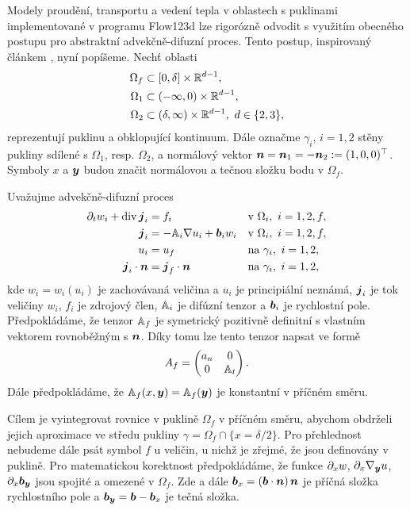 


Modely proudění, transportu a vedení tepla v oblastech s puklinami implementované v programu Flow123d lze rigorózně odvodit s využitím obecného postupu pro abstraktní advekčně-difuzní proces.
Tento postup, inspirovaný článkem \cite{martin_modeling_2005}, nyní popíšeme.
Nechť oblasti
\begin{align*}
 \Omega_f &\subset [0,\delta] \times \mathbb R^{d-1},\\
 \Omega_1 &\subset (-\infty,0)\times \mathbb R^{d-1},\\
 \Omega_2 &\subset (\delta,\infty)\times \mathbb R^{d-1},~d\in\{2,3\},
\end{align*}
reprezentují puklinu a obklopující kontinuum.
Dále označme $\gamma_i$, $i=1,2$ stěny pukliny sdílené s $\Omega_1$, resp. $\Omega_2$,
a normálový vektor $\mathbf{\boldsymbol{n}}=\mathbf{\boldsymbol{n}}_1=-\mathbf{\boldsymbol{n}}_2:=(1,0,0)^\top$.
Symboly $x$ a $\mathbf{\boldsymbol{y}}$ budou značit normálovou a tečnou složku bodu v $\Omega_f$. 

Uvažujme advekčně-difuzní proces
\begin{align}
  \label{eq:fr:continuity}
  \prtl_t w_i + \div \vc j_i &= f_i&&  \text{v } \Omega_i,\ i=1,2,f,\\
  \label{eq:fr:flux}
  \vc j_i &= - \tn A_i\grad u_i + \vc b_i w_i&& \text{v } \Omega_i,\ i=1,2,f,\\
  \label{eq:fr:Dirichlet}
  u_i &= u_f&& \text{na } \gamma_i,\ i=1,2,\\
  \label{eq:fr:Neumann}
  \vc j_i \cdot \vc n &= \vc j_f \cdot \vc n&& \text{na } \gamma_i,\ i=1,2,
\end{align}
kde $w_i=w_i(u_i)$ je zachovávaná veličina a $u_i$ je principiální neznámá, $\mathbf{\boldsymbol{j}}_i$ je tok veličiny $w_i$, $f_i$ je zdrojový člen,
${\mathbb{A}}_i$ je difúzní tenzor a $\mathbf{\boldsymbol{b}}_i$ je rychlostní pole.
Předpokládáme, že tenzor ${\mathbb{A}}_f$ je symetrický pozitivně definitní 
s vlastním vektorem rovnoběžným s $\mathbf{\boldsymbol{n}}$.
Díky tomu lze tento tenzor napsat ve formě
\[
 A_f = \begin{pmatrix} 
            a_n & 0  \\
            0 & {\mathbb{A}}_t
       \end{pmatrix}.
\]
Dále předpokládáme, že ${\mathbb{A}}_f(x, \mathbf{\boldsymbol{y}})={\mathbb{A}}_f(\mathbf{\boldsymbol{y}})$ je konstantní v příčném směru.

Cílem je vyintegrovat rovnice v puklině $\Omega_f$ v příčném směru, abychom obdrželi jejich aproximace ve středu pukliny $\gamma=\Omega_f \cap \{x=\delta/2\}$. 
Pro přehlednost nebudeme dále psát symbol $f$ u veličin, u nichž je zřejmé, že jsou definovány v puklině. 
Pro matematickou korektnost předpokládáme, že funkce
$\partial_x w$, $\partial_x \nabla_{\mathbf{\boldsymbol{y}}} u$, $\partial_x \mathbf{\boldsymbol{b}}_{\mathbf{\boldsymbol{y}}}$ jsou spojité a omezené v $\Omega_f$. Zde a dále
$\mathbf{\boldsymbol{b}}_x=(\mathbf{\boldsymbol{b}} \cdot \mathbf{\boldsymbol{n}})\, \mathbf{\boldsymbol{n}}$ je příčná složka rychlostního pole a $\mathbf{\boldsymbol{b}}_{\mathbf{\boldsymbol{y}}} = \mathbf{\boldsymbol{b}} - \mathbf{\boldsymbol{b}}_x$ je tečná složka.

